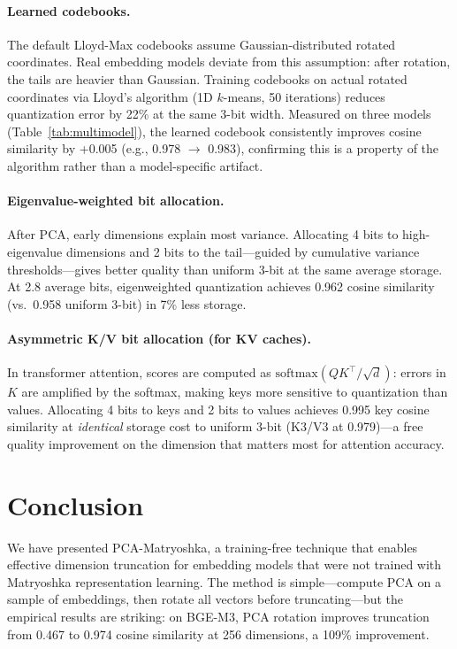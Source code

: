 \documentclass[journal]{IEEEtran}
\begin{document}
\paragraph{Learned codebooks.}
The default Lloyd-Max codebooks assume Gaussian-distributed rotated
coordinates.  Real embedding models deviate from this assumption:
after rotation, the tails are heavier than Gaussian.  Training
codebooks on actual rotated coordinates via Lloyd's algorithm (1D
$k$-means, 50 iterations) reduces quantization error by 22\% at the
same 3-bit width.  Measured on three models (Table~\ref{tab:multimodel}),
the learned codebook consistently improves cosine similarity by +0.005
(e.g., 0.978 $\to$ 0.983), confirming this is a property of the
algorithm rather than a model-specific artifact.

\paragraph{Eigenvalue-weighted bit allocation.}
After PCA, early dimensions explain most variance.  Allocating 4 bits
to high-eigenvalue dimensions and 2 bits to the tail---guided by
cumulative variance thresholds---gives better quality than uniform
3-bit at the same average storage.  At 2.8 average bits, eigenweighted
quantization achieves 0.962 cosine similarity (vs.\ 0.958 uniform
3-bit) in 7\% less storage.

\paragraph{Asymmetric K/V bit allocation (for KV caches).}
In transformer attention, scores are computed as
$\text{softmax}(QK^\top / \sqrt{d})$: errors in $K$ are amplified by
the softmax, making keys more sensitive to quantization than values.
Allocating 4 bits to keys and 2 bits to values achieves 0.995 key
cosine similarity at \emph{identical} storage cost to uniform 3-bit
(K3/V3 at 0.979)---a free quality improvement on the dimension that
matters most for attention accuracy.


\section{Conclusion}
\label{sec:conclusion}

We have presented PCA-Matryoshka, a training-free technique that enables effective dimension truncation for embedding models that were not trained with Matryoshka representation learning.
The method is simple---compute PCA on a sample of embeddings, then rotate all vectors before truncating---but the empirical results are striking: on BGE-M3, PCA rotation improves truncation from 0.467 to 0.974 cosine similarity at 256 dimensions, a 109\% improvement.
\end{document}
